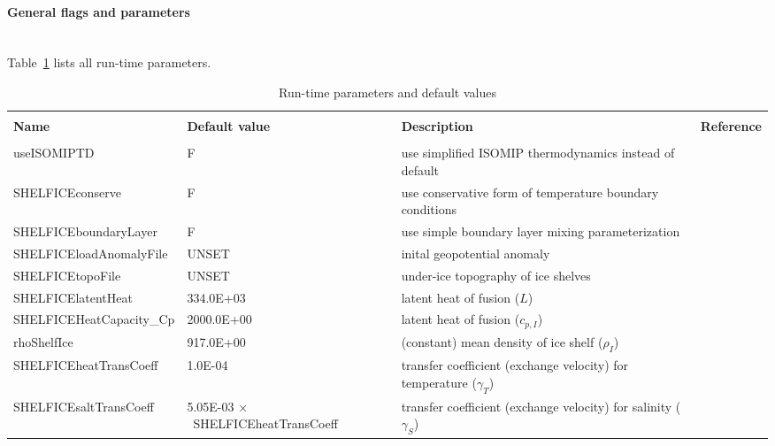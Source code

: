 \paragraph{General flags and parameters}
~ \\
%
Table~\ref{tab:pkg:shelfice:runtimeparms} lists all run-time parameters.
\begin{table}[h!]
  \caption{Run-time parameters and default values
    \label{tab:pkg:shelfice:runtimeparms}}
  {\footnotesize
    \begin{tabular}{|lp{4cm}p{4cm}c|}
      \hline
      & & & \\
      \textbf{Name}  &  \textbf{Default value}  
      &  \textbf{Description}   &  \textbf{Reference}  \\
      & & & \\
      \hline \hline
      useISOMIPTD              & F
      &   use simplified ISOMIP thermodynamics instead of default
      &  %
      \\
      SHELFICEconserve         & F
      &   use conservative form of temperature boundary conditions
      &  %
      \\
      SHELFICEboundaryLayer    & F
      &   use simple boundary layer mixing parameterization
      &  %
      \\
      SHELFICEloadAnomalyFile  & UNSET
      &   inital geopotential anomaly
      &  %
      \\
      SHELFICEtopoFile         & UNSET
      &   under-ice topography of ice shelves
      &  %
      \\
      SHELFICElatentHeat       &  334.0E+03
      &   latent heat of fusion ($L$)
      &  %
      \\
      SHELFICEHeatCapacity\_Cp & 2000.0E+00
      &   latent heat of fusion ($c_{p,I}$)
      &  %
      \\
      rhoShelfIce              &  917.0E+00
      &   (constant) mean density of ice shelf ($\rho_{I}$)
      &  %
      \\
      SHELFICEheatTransCoeff   &    1.0E-04
      &   transfer coefficient (exchange velocity) for temperature
      ($\gamma_T$)
      &  %
      \\
      SHELFICEsaltTransCoeff   &   5.05E-03 $\times$~SHELFICEheatTransCoeff
      &   transfer coefficient (exchange velocity) for salinity
      ($\gamma_S$)
      &  %
      \\

\end{tabular}}
\end{table}
